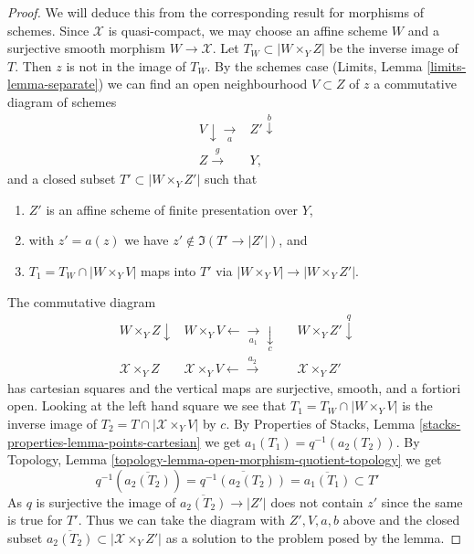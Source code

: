 \begin{proof}
We will deduce this from the corresponding result for morphisms of schemes.
Since $\mathcal{X}$ is quasi-compact, we may choose an affine scheme
$W$ and a surjective smooth morphism $W \to \mathcal{X}$.
Let $T_W \subset |W \times_Y Z|$ be the inverse image of $T$.
Then $z$ is not in the image of $T_W$.
By the schemes case (Limits, Lemma \ref{limits-lemma-separate})
we can find an open neighbourhood $V \subset Z$ of $z$
a commutative diagram of schemes
$$
\begin{array}{cc}V \downarrow\underset{a}{\longrightarrow} & Z' \overset{b}{\downarrow} \\ Z \overset{g}{\longrightarrow} & Y,\end{array}
$$
and a closed subset $T' \subset |W \times_Y Z'|$ such that
\begin{enumerate}
\item $Z'$ is an affine scheme of finite presentation over $Y$,
\item with $z' = a(z)$ we have $z' \not \in \Im(T' \to |Z'|)$, and
\item $T_1 = T_W \cap |W \times_Y V|$ maps into $T'$ via
$|W \times_Y V| \to |W \times_Y Z'|$.
\end{enumerate}
The commutative diagram
$$
\begin{array}{cccc}W \times_Y Z \downarrow & W \times_Y V \longleftarrow\underset{a_1}{\longrightarrow}\underset{c}{\downarrow} &  & W \times_Y Z' \overset{q}{\downarrow} \\ \mathcal{X} \times_Y Z & \mathcal{X} \times_Y V \longleftarrow\overset{a_2}{\longrightarrow} &  & \mathcal{X} \times_Y Z'\end{array}
$$
has cartesian squares and the vertical maps are surjective, smooth,
and a fortiori open. Looking at the left hand square we
see that $T_1 = T_W \cap |W \times_Y V|$ is the inverse image of
$T_2 = T \cap |\mathcal{X} \times_Y V|$ by $c$. By Properties of Stacks, Lemma
\ref{stacks-properties-lemma-points-cartesian} we get
$a_1(T_1) = q^{-1}(a_2(T_2))$.
By Topology, Lemma \ref{topology-lemma-open-morphism-quotient-topology}
we get
$$
q^{-1}\left(\overline{a_2(T_2)}\right) =
\overline{q^{-1}(a_2(T_2))} =
\overline{a_1(T_1)} \subset T'
$$
As $q$ is surjective the image of $\overline{a_2(T_2)} \to |Z'|$
does not contain $z'$ since the same is true for $T'$.
Thus we can take the diagram with $Z', V, a, b$ above and the
closed subset $\overline{a_2(T_2)} \subset |\mathcal{X} \times_Y Z'|$ as
a solution to the problem posed by the lemma.
\end{proof}

